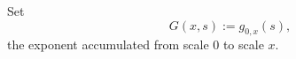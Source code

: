 %
%
%
%
%

Set
\[
  G(x,s) := g_{0,x}(s),
\]
the exponent accumulated from scale $0$ to scale $x$.

